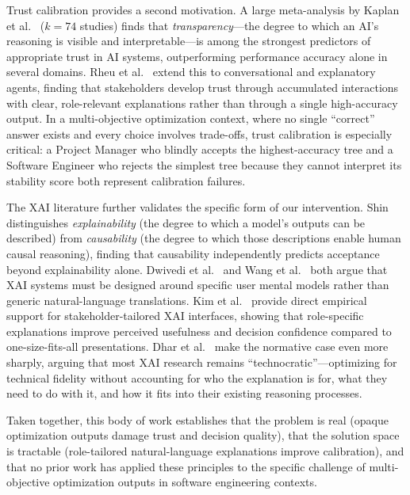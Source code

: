 \documentclass[sigconf,review]{acmart}
\begin{document}
Trust calibration provides a second motivation. A large meta-analysis by
Kaplan et al.~\cite{kaplan2023trust} ($k=74$ studies) finds that
\textit{transparency}---the degree to which an AI's reasoning is visible and
interpretable---is among the strongest predictors of appropriate trust in AI
systems, outperforming performance accuracy alone in several domains. Rheu et
al.~\cite{rheu2021systematic} extend this to conversational and explanatory
agents, finding that stakeholders develop trust through accumulated interactions
with clear, role-relevant explanations rather than through a single high-accuracy
output. In a multi-objective optimization context, where no single ``correct''
answer exists and every choice involves trade-offs, trust calibration is
especially critical: a Project Manager who blindly accepts the highest-accuracy
tree and a Software Engineer who rejects the simplest tree because they cannot
interpret its stability score both represent calibration failures.

The XAI literature further validates the specific form of our intervention.
Shin~\cite{Shin2021_ExplainabilityCausability} distinguishes \textit{explainability}
(the degree to which a model's outputs can be described) from
\textit{causability} (the degree to which those descriptions enable human
causal reasoning), finding that causability independently predicts
acceptance beyond explainability alone. Dwivedi et al.~\cite{Dwivedi2023_ExplainableAI}
and Wang et al.~\cite{wang2019designing} both argue that XAI systems must be
designed around specific user mental models rather than generic natural-language
translations. Kim et al.~\cite{kim2024stakeholder} provide direct empirical
support for stakeholder-tailored XAI interfaces, showing that role-specific
explanations improve perceived usefulness and decision confidence compared to
one-size-fits-all presentations. Dhar et al.~\cite{dhar2025beyond} make the
normative case even more sharply, arguing that most XAI research remains
``technocratic''---optimizing for technical fidelity without accounting for who
the explanation is for, what they need to do with it, and how it fits into their
existing reasoning processes.

Taken together, this body of work establishes that the problem is real
(opaque optimization outputs damage trust and decision quality), that the
solution space is tractable (role-tailored natural-language explanations
improve calibration), and that no prior work has applied these principles to
the specific challenge of multi-objective optimization outputs in software
engineering contexts.
\end{document}
